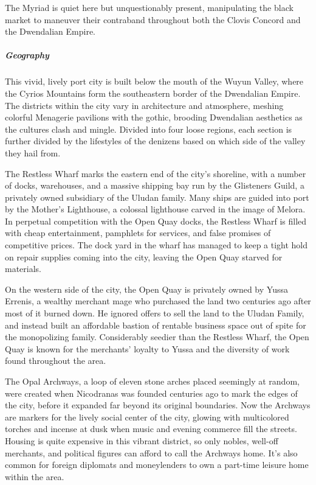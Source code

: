 \documentclass[10pt,a4paper,twoside,bg=print,twocolumn,openany,nodeprecatedcode]{dndbook}
\begin{document}
The Myriad is quiet here but unquestionably present, manipulating the black market to maneuver their contraband throughout both the Clovis Concord and the Dwendalian Empire.

\subparagraph{Geography}
This vivid, lively port city is built below the mouth of the Wuyun Valley, where the Cyrios Mountains form the southeastern border of the Dwendalian Empire. The districts within the city vary in architecture and atmosphere, meshing colorful Menagerie pavilions with the gothic, brooding Dwendalian aesthetics as the cultures clash and mingle. Divided into four loose regions, each section is further divided by the lifestyles of the denizens based on which side of the valley they hail from.

The Restless Wharf marks the eastern end of the city's shoreline, with a number of docks, warehouses, and a massive shipping bay run by the Glisteners Guild, a privately owned subsidiary of the Uludan family. Many ships are guided into port by the Mother's Lighthouse, a colossal lighthouse carved in the image of Melora. In perpetual competition with the Open Quay docks, the Restless Wharf is filled with cheap entertainment, pamphlets for services, and false promises of competitive prices. The dock yard in the wharf has managed to keep a tight hold on repair supplies coming into the city, leaving the Open Quay starved for materials.

On the western side of the city, the Open Quay is privately owned by Yussa Errenis, a wealthy merchant mage who purchased the land two centuries ago after most of it burned down. He ignored offers to sell the land to the Uludan Family, and instead built an affordable bastion of rentable business space out of spite for the monopolizing family. Considerably seedier than the Restless Wharf, the Open Quay is known for the merchants' loyalty to Yussa and the diversity of work found throughout the area.

The Opal Archways, a loop of eleven stone arches placed seemingly at random, were created when Nicodranas was founded centuries ago to mark the edges of the city, before it expanded far beyond its original boundaries. Now the Archways are markers for the lively social center of the city, glowing with multicolored torches and incense at dusk when music and evening commerce fill the streets. Housing is quite expensive in this vibrant district, so only nobles, well-off merchants, and political figures can afford to call the Archways home. It's also common for foreign diplomats and moneylenders to own a part-time leisure home within the area.
\end{document}
